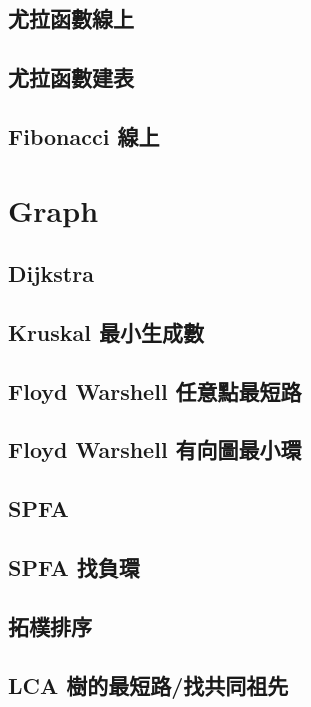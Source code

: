 \subsection{尤拉函數線上}

\subsection{尤拉函數建表}

\subsection{Fibonacci 線上}


\section{Graph}
\subsection{Dijkstra}

\subsection{Kruskal 最小生成數}

\subsection{Floyd Warshell 任意點最短路}

\subsection{Floyd Warshell 有向圖最小環}

\subsection{SPFA}

\subsection{SPFA 找負環}

\subsection{拓樸排序}

\subsection{LCA 樹的最短路/找共同祖先}

